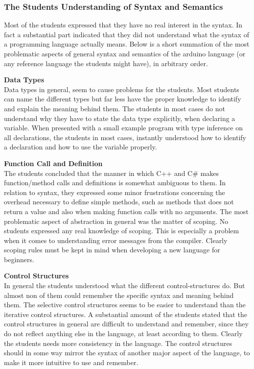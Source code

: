 \subsubsection{The Students Understanding of Syntax and Semantics}
Most of the students expressed that they have no real interest in the syntax. 
In fact a substantial part indicated that they did not understand what the syntax of a programming language actually means. 
Below is a short summation of the most problematic aspects of general syntax and semantics of the arduino language (or any reference language the students might have), in arbitrary order.

\textbf{Data Types}\\
Data types in general, seem to cause problems for the students. 
Most students can name the different types but far less have the proper knowledge to identify and explain the meaning behind them. 
The students in most cases do not understand why they have to state the data type explicitly, when declaring a variable. 
When presented with a small example program with type inference on all declarations, the students in most cases, instantly understood how to identify a declaration and how to use the variable properly.

\textbf{Function Call and Definition}\\
The students concluded that the manner in which C++ and C{\#} makes function/method calls and definitions is somewhat ambiguous to them. 
In relation to syntax, they expressed some minor frustrations concerning the overhead necessary to define simple methods, such as methods that does not return a value and also when making function calls with no arguments. 
The most problematic aspect of abstraction in general was the matter of scoping. 
No students expressed any real knowledge of scoping. 
This is especially a problem when it comes to understanding error messages from the compiler. 
Clearly scoping rules must be kept in mind when developing a new language for beginners.

\textbf{Control Structures}\\
In general the students understood what the different control-structures do. 
But almost non of them could remember the specific syntax and meaning behind them. 
The selective control structures seems to be easier to understand than the iterative control structures. 
A substantial amount of the students stated that the control structures in general are difficult to understand and remember, since they do not reflect anything else in the language, at least according to them.
Clearly the students needs more consistency in the language. 
The control structures should in some way mirror the syntax of another major aspect of the language, to make it more intuitive to use and remember.

